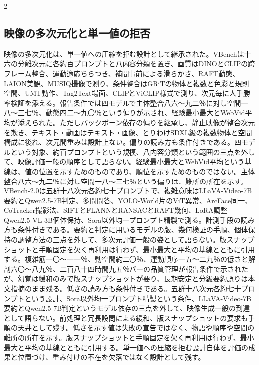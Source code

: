 \documentclass[lualatex,a4paper,10pt]{jlreq}
\begin{document}
\begin{multicols}{2}
\subsection{映像の多次元化と単一値の拒否}
映像の多次元化は、単一値への圧縮を拒む設計として継承された。VBenchは十六の分離次元に各約百プロンプトと八内容分類を置き、画質はDINOとCLIPの跨フレーム整合、運動適応ちらつき、補間事前による滑らかさ、RAFT動態、LAION美観、MUSIQ撮像で測り、条件整合はGRiTの物体と複数と色彩と規則空間、UMT動作、Tag2Text場面、CLIPとViCLIP様式で測り、次元毎に人手勝率検証を添える\autocite{btd092}。報告条件では四モデルで主体整合八六〜九二％に対し空間一八〜三七％、動態四二〜九〇％という偏りが示され、経験最小最大とWebVid平均が添えられた。ただしバックボーン依存の偏りを継承し、静止映像が整合次元を欺き、テキスト・動画はテキスト・画像、とりわけSDXL級の複数物体と空間構成に後れ、次元間重みは設計上ない\autocite{btd092}。偏りの読み方も条件付きである。四モデルという対象、約百プロンプトという規模、八内容分類という範囲の三点を外して、映像評価一般の順序として語らない。経験最小最大とWebVid平均という基線は、値の位置を示すためのものであり、順位を示すためのものではない。主体整合八六〜九二％に対し空間一八〜三七％という偏りは、難所の所在を示す\autocite{btd092}。VBench-2.0は五群十八次元各約七十プロンプトで、複雑意味はLLaVA-Video-7B要約とQwen2.5-7B判定、多問問答、YOLO-World片のViT異常、ArcFace同一、CoTracker撮影法、SIFTとFLANNとRANSACとRAFT幾何、LoRA調整Qwen2.5-VL-3B個体保持、Sora以外均一プロンプト精製で測る\autocite{btd093}。計測手段の読み方も条件付きである。要約と判定に用いるモデルの版、幾何検証の手順、個体保持の調整方法の三点を外して、多次元評価一般の姿として語らない。版スナップショットと手順固定を欠く再利用は行わず、最小最大と平均の基線とともに引用する\autocite{btd093}。複雑筋一〇〜一一％、動空間約二〇％、運動順序一五〜二九％の低さと解剖六〇〜八九％、二百八十四時間九五％バーの品質管理が報告条件で示されたが、幻覚は緩和のみで版スナップショットが要り、長期安定と分級要約誤りは本文指摘のまま残る\autocite{btd093}。低さの読み方も条件付きである。五群十八次元各約七十プロンプトという設計、Sora以外均一プロンプト精製という条件、LLaVA-Video-7B要約とQwen2.5-7B判定というモデル依存の三点を外して、映像生成一般の到達として語らない。前処理と冗長設問による緩和、版スナップショットの要求も手順の天井として残す\autocite{btd093}。低さを示す値は失敗の宣告ではなく、物語や順序や空間の難所の所在を示す。版スナップショットと手順固定を欠く再利用は行わず、最小最大と平均の基線とともに引用する。単一値への圧縮を拒む設計自体を評価の成果と位置づけ、重み付けの不在を欠落ではなく設計として残す\autocite{btd092,btd093}。


\end{multicols}
\end{document}
